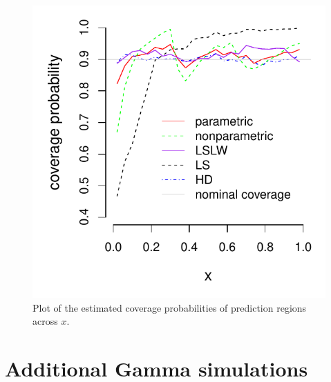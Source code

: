 \documentclass[11pt]{article}\usepackage[]{graphicx}\usepackage[]{color}
\makeatletter
\def\maxwidth{ %
  \ifdim\Gin@nat@width>\linewidth
    \linewidth
  \else
    \Gin@nat@width
  \fi
}
\newenvironment{knitrout}{}{} %
\makeatother
\begin{document}
\begin{figure}[h!]
\begin{center}
\begin{knitrout}
\color{fgcolor}
\includegraphics[width=\maxwidth]{figure/readme-inx-1} 

\end{knitrout}
\end{center}
\caption{Plot of the estimated coverage probabilities of prediction regions 
  across $x$.}
\label{Fig:coverageinx500.3}
\end{figure}




\newpage
\section{Additional Gamma simulations}
\label{sec:Gamma}
\end{document}
